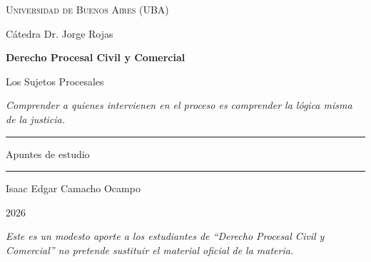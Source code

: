\documentclass[12pt,oneside]{book}
\newcommand{\universidad}{Universidad de Buenos Aires (UBA)}
\newcommand{\materia}{Derecho Procesal Civil y Comercial}
\newcommand{\titulo}{Los Sujetos Procesales}
\newcommand{\catedra}{Cátedra Dr. Jorge Rojas}
\newcommand{\autor}{Isaac Edgar Camacho Ocampo}
\newcommand{\anio}{2026}
\begin{document}
\begin{titlepage}
\thispagestyle{empty}

\begin{center}

\vspace*{1cm}

{\large \textsc{\universidad}}

\vspace{0.3cm}

{\normalsize \catedra}

\vspace{3cm}

{\Huge \textbf{\materia}}

\vspace{1cm}

{\LARGE \titulo}

\vspace{0.8cm}

\textit{Comprender a quienes intervienen en el proceso es comprender la lógica misma de la justicia.}

\vspace{1.2cm}

\rule{0.70\textwidth}{0.5pt}

\vspace{0.5cm}

{\large Apuntes de estudio}

\vspace{0.5cm}

\rule{0.70\textwidth}{0.5pt}

\vfill

{\large \autor}

\vspace{0.3cm}

{\large \anio}

\end{center}

\vfill

\begin{flushleft}
\textit{Este es un modesto aporte a los estudiantes de ``Derecho Procesal Civil y Comercial'' no pretende sustituir el material oficial de la materia.}
\end{flushleft}

\end{titlepage}

\tableofcontents
\end{document}
